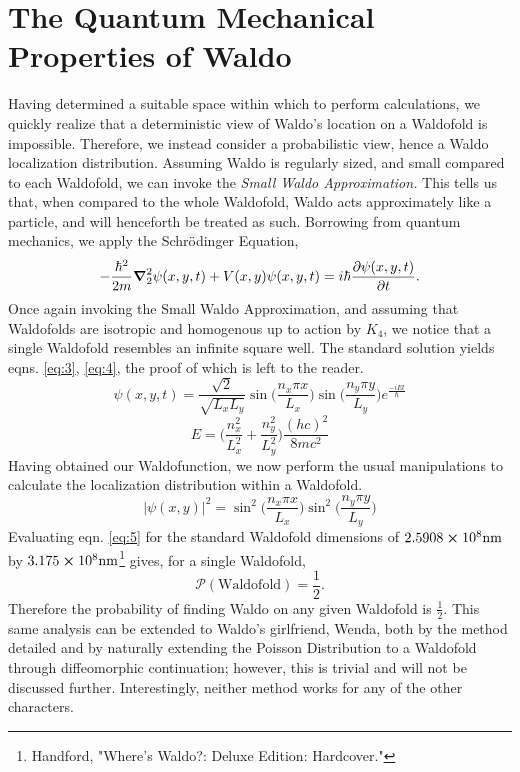 \documentclass{article}
\begin{document}
\section{The Quantum Mechanical Properties of Waldo}
Having determined a suitable space within which to perform calculations, we quickly realize that a deterministic view of Waldo's location on a Waldofold is impossible. Therefore, we instead consider a probabilistic view, hence a Waldo localization distribution. Assuming Waldo is regularly sized, and small compared to each Waldofold, we can invoke the \emph{Small Waldo Approximation.} This tells us that, when compared to the whole Waldofold, Waldo acts approximately like a particle, and will henceforth be treated as such. Borrowing from quantum mechanics, we apply the Schrödinger Equation,
\begin{equation}
	-\frac{\hbar^2}{2m}\grad_2^2\psi(x,y,t)+V(x,y)\psi(x,y,t) = i\hbar\frac{\partial\psi(x,y,t)}{\partial t}.
\end{equation}
Once again invoking the Small Waldo Approximation, and assuming that Waldofolds are isotropic and homogenous up to action by $K_4$, we notice that a single Waldofold resembles an infinite square well. The standard solution yields eqns. \ref{eq:3}, \ref{eq:4}, the proof of which is left to the reader.
\begin{equation}
	\label{eq:3}
	\psi(x,y,t) = \frac{\sqrt{2}}{\sqrt{L_xL_y}}\sin\Big(\frac{n_x \pi x}{L_x}\Big)\sin\Big(\frac{n_y \pi y}{L_y}\Big)e^{\frac{-iEt}{\hbar}}
\end{equation}
\begin{equation}
	\label{eq:4}
	E = \Big(\frac{n^2_x}{L^2_x}+\frac{n^2_y}{L^2_y}\Big)\frac{(hc)^2}{8mc^2}
\end{equation}
Having obtained our Waldofunction, we now perform the usual manipulations to calculate the localization distribution within a Waldofold.
\begin{equation}
	\label{eq:5}
	|\psi(x,y)|^2 = \sin^2 \Big(\frac{n_x \pi x}{L_x} \Big) \sin^2 \Big(\frac{n_y \pi y}{L_y} \Big)
\end{equation}
Evaluating eqn. \ref{eq:5} for the standard Waldofold dimensions of $2.5908 \cross 10^8 \si{\nano\metre}$ by $3.175 \cross 10^8 \si{\nano\metre}$\footnote{Handford, "Where's Waldo?: Deluxe Edition: Hardcover."} gives, for a single Waldofold,
\begin{equation}
	\label{eq:6}
	\mathcal{P}(\text{Waldofold}) = \frac{1}{2}.
\end{equation}
Therefore the probability of finding Waldo on any given Waldofold is $\frac{1}{2}$. This same analysis can be extended to Waldo's girlfriend, Wenda, both by the method detailed and by naturally extending the Poisson Distribution to a Waldofold through diffeomorphic continuation; however, this is trivial and will not be discussed further. Interestingly, neither method works for any of the other characters.
\end{document}
